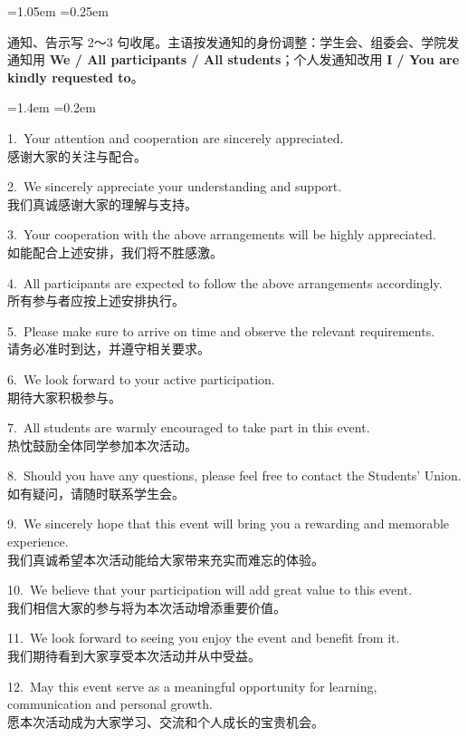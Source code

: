 \documentclass[11pt,a4paper]{ctexart}
\newcommand{\kw}[1]{{\bfseries\color{accent}#1}}
\newenvironment{note}{%
  \par\addvspace{5pt}%
  \begin{list}{}{\leftmargin=1.05em \rightmargin=0.25em \listparindent=0pt
    \itemindent=0pt \topsep=0pt \parsep=2pt \itemsep=2pt \partopsep=0pt}%
  \item\relax\small\color{ink}%
}{%
  \end{list}\addvspace{5pt}%
}
\newenvironment{eg}{%
  \par\addvspace{4pt}%
  \begin{list}{}{\leftmargin=1.4em \rightmargin=0.2em \listparindent=0pt
    \itemindent=0pt \topsep=0pt \parsep=2pt \itemsep=2pt \partopsep=0pt}%
  \item\relax
}{%
  \end{list}\addvspace{5pt}%
}
\begin{document}
\begin{note}
通知、告示写 2～3 句收尾。主语按发通知的身份调整：学生会、组委会、学院发通知用 \kw{We / All participants / All students}；个人发通知改用 \kw{I / You are kindly requested to}。
\end{note}

\begin{eg}
1.\ Your attention and cooperation are sincerely appreciated.\\
感谢大家的关注与配合。

2.\ We sincerely appreciate your understanding and support.\\
我们真诚感谢大家的理解与支持。

3.\ Your cooperation with the above arrangements will be highly appreciated.\\
如能配合上述安排，我们将不胜感激。

4.\ All participants are expected to follow the above arrangements accordingly.\\
所有参与者应按上述安排执行。

5.\ Please make sure to arrive on time and observe the relevant requirements.\\
请务必准时到达，并遵守相关要求。

6.\ We look forward to your active participation.\\
期待大家积极参与。

7.\ All students are warmly encouraged to take part in this event.\\
热忱鼓励全体同学参加本次活动。

8.\ Should you have any questions, please feel free to contact the Students' Union.\\
如有疑问，请随时联系学生会。

9.\ We sincerely hope that this event will bring you a rewarding and memorable experience.\\
我们真诚希望本次活动能给大家带来充实而难忘的体验。

10.\ We believe that your participation will add great value to this event.\\
我们相信大家的参与将为本次活动增添重要价值。

11.\ We look forward to seeing you enjoy the event and benefit from it.\\
我们期待看到大家享受本次活动并从中受益。

12.\ May this event serve as a meaningful opportunity for learning, communication and personal growth.\\
愿本次活动成为大家学习、交流和个人成长的宝贵机会。
\end{eg}
\end{document}
